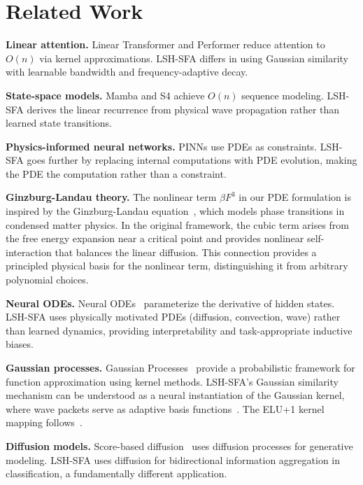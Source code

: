 \documentclass{article}
\begin{document}
\section{Related Work}

\textbf{Linear attention.} Linear Transformer \citep{katharopoulos2020transformers} and Performer \citep{choromanski2021rethinking} reduce attention to $O(n)$ via kernel approximations. LSH-SFA differs in using Gaussian similarity with learnable bandwidth and frequency-adaptive decay.

\textbf{State-space models.} Mamba \citep{gu2023mamba} and S4 \citep{gu2021efficiently} achieve $O(n)$ sequence modeling. LSH-SFA derives the linear recurrence from physical wave propagation rather than learned state transitions.

\textbf{Physics-informed neural networks.} PINNs \citep{raissi2019physics} use PDEs as constraints. LSH-SFA goes further by replacing internal computations with PDE evolution, making the PDE the computation rather than a constraint.

\textbf{Ginzburg-Landau theory.} The nonlinear term $\beta F^3$ in our PDE formulation is inspired by the Ginzburg-Landau equation~\citep{ginzburg1950k}, which models phase transitions in condensed matter physics. In the original framework, the cubic term arises from the free energy expansion near a critical point and provides nonlinear self-interaction that balances the linear diffusion. This connection provides a principled physical basis for the nonlinear term, distinguishing it from arbitrary polynomial choices.

\textbf{Neural ODEs.} Neural ODEs~\citep{chen2018neural} parameterize the derivative of hidden states. LSH-SFA uses physically motivated PDEs (diffusion, convection, wave) rather than learned dynamics, providing interpretability and task-appropriate inductive biases.

\textbf{Gaussian processes.} Gaussian Processes~\citep{rasmussen2006gaussian} provide a probabilistic framework for function approximation using kernel methods. LSH-SFA's Gaussian similarity mechanism can be understood as a neural instantiation of the Gaussian kernel, where wave packets serve as adaptive basis functions~\citep{broomhead1988multivariable}. The ELU+1 kernel mapping follows~\citep{clevert2016fast, tsai2019transformer}.

\textbf{Diffusion models.} Score-based diffusion~\citep{song2021scorebased} uses diffusion processes for generative modeling. LSH-SFA uses diffusion for bidirectional information aggregation in classification, a fundamentally different application.
\end{document}
